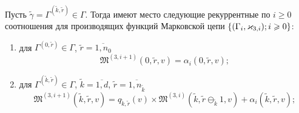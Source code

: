 \documentclass[a4paper,12pt,russian]{extarticle}
\newcommand{\MarkThree}{\{(\Gamma_i, \varkappa_{3,i}); \hm{} i \geqslant 0\}}
\begin{document}
\begin{theorem}
Пусть $\tilde{\gamma}=\Gamma^{(\tilde{k},\tilde{r})} \in \Gamma$. Тогда имеют место следующие рекуррентные по $i \geqslant 0$ соотношения для производящих функций Марковской цепи $\MarkThree$:
\begin{enumerate}
\item для $ \Gamma^{(0,\tilde{r})} \in \Gamma$, $\tilde{r} = \overline{1,n_0}$ 
\begin{equation}
\mathfrak{M}^{(3,i+1)}(0,\tilde{r},v) = \alpha_i(0,\tilde{r},v);
\label{three:generation:rek:one}
\end{equation}
\item для $\Gamma^{(\tilde{k},\tilde{r})} \in \Gamma $, $\tilde{k} =\overline{1,d}$, $\tilde{r}=\overline{1,n_{\tilde{k}}}$
\begin{equation}
\mathfrak{M}^{(3,i+1)}(\tilde{k},\tilde{r},v) = q_{\tilde{k},\tilde{r}} (v)\times  \mathfrak{M}^{(3,i)}(\tilde{k},\tilde{r} \ominus_{\tilde{k}} 1,v) + \alpha_i(\tilde{k},\tilde{r},v);
\label{three:generation:rek:two}
\end{equation}
\end{enumerate}

\label{theorem:gen:rek}
\end{theorem}
\end{document}

